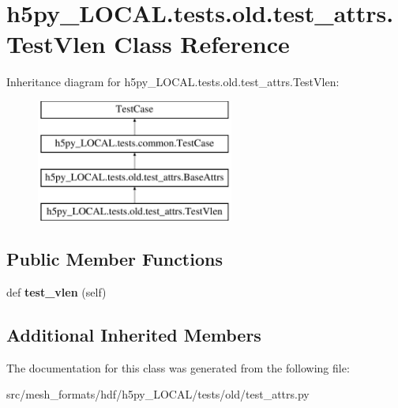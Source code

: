 \hypertarget{classh5py__LOCAL_1_1tests_1_1old_1_1test__attrs_1_1TestVlen}{}\section{h5py\+\_\+\+L\+O\+C\+A\+L.\+tests.\+old.\+test\+\_\+attrs.\+Test\+Vlen Class Reference}
\label{classh5py__LOCAL_1_1tests_1_1old_1_1test__attrs_1_1TestVlen}
Inheritance diagram for h5py\+\_\+\+L\+O\+C\+A\+L.\+tests.\+old.\+test\+\_\+attrs.\+Test\+Vlen\+:\begin{figure}[H]
\begin{center}
\leavevmode
\includegraphics[height=4.000000cm]{classh5py__LOCAL_1_1tests_1_1old_1_1test__attrs_1_1TestVlen}
\end{center}
\end{figure}
\subsection*{Public Member Functions}
\begin{DoxyCompactItemize}
\item 
\mbox{\label{classh5py__LOCAL_1_1tests_1_1old_1_1test__attrs_1_1TestVlen_a5b1b08e31cf69fe8a5189a57369e6484}} 
def {\bfseries test\+\_\+vlen} (self)
\end{DoxyCompactItemize}
\subsection*{Additional Inherited Members}


The documentation for this class was generated from the following file\+:\begin{DoxyCompactItemize}
\item 
src/mesh\+\_\+formats/hdf/h5py\+\_\+\+L\+O\+C\+A\+L/tests/old/test\+\_\+attrs.\+py\end{DoxyCompactItemize}
